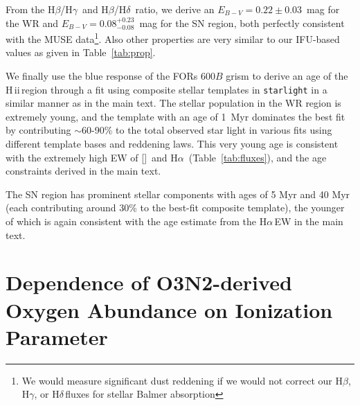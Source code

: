 \documentclass[traditabstract]{aa}
\newcommand{\hb}{H$\beta$}
\newcommand{\ha}{H$\alpha$}
\newcommand{\hg}{H$\gamma$}
\newcommand{\hd}{H$\delta$}
\newcommand{\hii}{\mbox{H\,{\sc ii}}}
\newcommand{\oiii}{[\ion{O}{iii}]}
\begin{document}
\begin{appendix}
From the \hb/\hg\, and \hb/\hd\, ratio, we derive an $E_{B-V}=0.22\pm0.03$~mag for the WR and $E_{B-V}=0.08_{-0.08}^{+0.23}$~mag for the SN region, both perfectly consistent with the MUSE data\footnote{We would measure significant dust reddening if we would not correct our \hb, \hg, or \hd\,fluxes for stellar Balmer absorption}. Also other properties are very similar to our IFU-based values as given in Table~\ref{tab:prop}.

We finally use the blue response of the FORs 600$B$ grism to derive an age of the \hii\,region through a fit using composite stellar templates in \texttt{starlight} in a similar manner as in the main text. The stellar population in the WR region is extremely young, and the \citet{2003MNRAS.344.1000B} template with an age of 1~Myr dominates the best fit by contributing $\sim$60-90\% to the total observed star light in various fits using different template bases and reddening laws. This very young age is consistent with the extremely high EW of \oiii\, and \ha\, (Table~\ref{tab:fluxes}), and the age constraints derived in the main text.

The SN region has prominent stellar components with ages of 5 Myr and 40 Myr (each contributing around 30\% to the best-fit composite template), the younger of which is again consistent with the age estimate from the \ha\,EW in the main text.

\section{Dependence of O3N2-derived Oxygen Abundance on Ionization Parameter}
\label{sec:abundancevsion}


\end{appendix}
\end{document}

